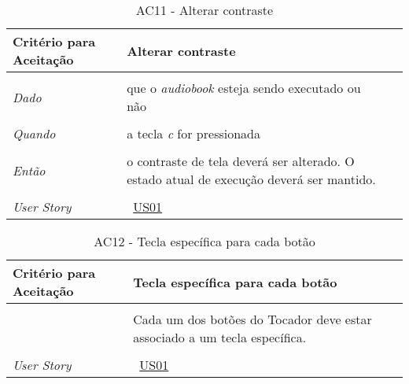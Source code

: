 \begin{apendicesenv}

\begin{table}[ht]
\centering
\caption{AC11 - Alterar contraste}
\vspace{0.1cm}
\begin{center}
\begin{tabularx}{\textwidth}{|lX|l|}

\hline
\textbf{Critério para Aceitação} & Alterar contraste \\
\hline
 & \\
\textit{Dado} & que o \textit{audiobook} esteja sendo executado ou não \\
 & \\
\textit{Quando} & a tecla \textit{c} for pressionada \\
 & \\
\textit{Então} & o contraste de tela deverá ser alterado. O estado atual de execução deverá ser mantido. \\
 & \\
\hline
\textit{User Story} & ~\hyperref[tab:us01]{US01} \\
\hline

\end{tabularx}
\end{center}
\label{tab:us01a11}
\end{table}
	

\begin{table}[ht]
\centering
\caption{AC12 - Tecla específica para cada botão}
\vspace{0.1cm}
\begin{center}
\begin{tabularx}{\textwidth}{|lX|l|}

\hline
\textbf{Critério para Aceitação} & Tecla específica para cada botão \\
\hline
 & \\
 & Cada um dos botões do Tocador deve estar associado a um tecla específica. \\
 & \\
\hline
\textit{User Story} & ~\hyperref[tab:us01]{US01} \\
\hline


\end{tabularx}
\end{center}
\end{table}
\end{apendicesenv}
